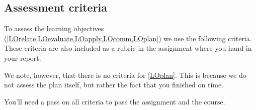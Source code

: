 %
%

\subsection{Assessment criteria}

To assess the learning objectives
(\cref{LOrelate,LOevaluate,LOapply,LOcomm,LOplan})
we use the following criteria.
These criteria are also included as a rubric in the assignment where you hand 
in your report.

We note, however, that there is no criteria for \cref{LOplan}.
This is because we do not assess the plan itself, but rather the fact that you 
finished on time.

You'll need a pass on all criteria to pass the assignment and the course.

